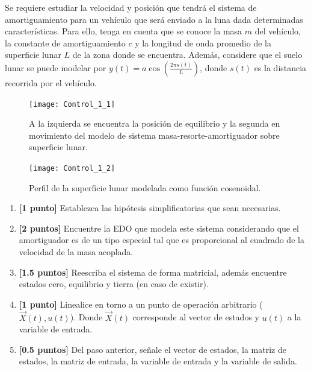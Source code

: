 \documentclass[
  11pt,
  letterpaper,
   addpoints,
   answers
  ]{exam}
\begin{document}
\begin{questions}
  \question

Se requiere estudiar la velocidad y posición que tendrá el sistema de amortiguamiento para un vehículo que será enviado a la luna dada determinadas características.
Para ello, tenga en cuenta que se conoce la masa $m$ del vehículo, la constante de amortiguamiento $c$ y la longitud de onda promedio de la superficie lunar $L$ de la zona donde se encuentra.
  Además, considere que el suelo lunar se puede modelar por $y(t) = a \cos\left(\frac{2\pi s(t)}{L}\right)$, donde $s(t)$ es la distancia recorrida por el vehículo.

\begin{figure}[H]
  \centering
  \texttt{[image: Control\_1\_1]} %
  \caption{A la izquierda se encuentra la posición de equilibrio y la segunda en movimiento del modelo de sistema masa-resorte-amortiguador sobre superficie lunar.}
  \label{fig:modelo_luna}
\end{figure}

\begin{figure}[H]
  \centering
  \texttt{[image: Control\_1\_2]} %
  \caption{Perfil de la superficie lunar modelada como función cosenoidal.}
  \label{fig:superficie_lunar}
\end{figure}

\begin{enumerate}
  \item \textbf{[1 punto]} Establezca las hipótesis simplificatorias que sean necesarias. 
  \item \textbf{[2 puntos]} Encuentre la EDO que modela este sistema considerando que el amortiguador es de un tipo especial tal que es proporcional al cuadrado de la velocidad de la masa acoplada.

  \item \textbf{[1.5 puntos]} Reescriba el sistema de forma matricial, además encuentre estados cero, equilibrio y tierra (en caso de existir).

  \item \textbf{[1 punto]} Linealice en torno a un punto de operación arbitrario ($\vec{X}(t), u(t)$). Donde $\vec{X}(t)$ corresponde al vector de estados y $u(t)$ a la variable de entrada.

  \item \textbf{[0.5 puntos]} Del paso anterior, señale el vector de estados, la matriz de estados, la matriz de entrada, la variable de entrada y la variable de salida.


\end{enumerate}
\end{questions}
\end{document}
